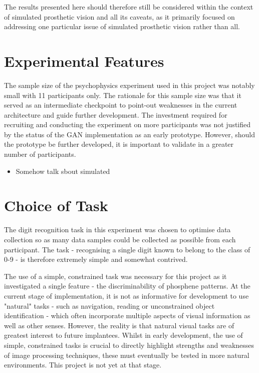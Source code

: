 \documentclass[a4paper,11pt,openany]{book}
\begin{document}
The results presented here should therefore still be considered within the context of simulated prosthetic vision and all its caveats, as it primarily focused on addressing one particular issue of simulated prosthetic vision rather than all.

\section*{Experimental Features}
\label{sec:org01b8480}

The sample size of the psychophysics experiment used in this project was notably small with 11 participants only.
The rationale for this sample size was that it served as an intermediate checkpoint to point-out weaknesses in the current architecture and guide further development.
The investment required for recruiting and conducting the experiment on more participants was not justified by the status of the GAN implementation as an early prototype.
However, should the prototype be further developed, it is important to validate in a greater number of participants.

\begin{itemize}
\item Somehow talk sbout simulated
\end{itemize}

\section*{Choice of Task}
\label{sec:orga87eff9}

The digit recognition task in this experiment was chosen to optimise data collection so as many data samples could be collected as possible from each participant.
The task - recognising a single digit known to belong to the class of 0-9 - is therefore extremely simple and somewhat contrived.

The use of a simple, constrained task was necessary for this project as it investigated a single feature - the discriminability of phosphene patterns.
At the current stage of implementation, it is not as informative for development to use "natural" tasks - such as navigation, reading or unconstrained object identification - which often incorporate multiple aspects of visual information as well as other senses.
However, the reality is that natural visual tasks are of greatest interest to future implantees.
Whilst in early development, the use of simple, constrained tasks is crucial to directly highlight strengths and weaknesses of image processing techniques, these must eventually be tested in more natural environments.
This project is not yet at that stage.
\end{document}
